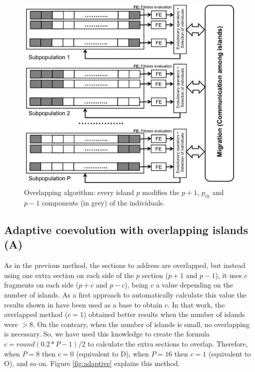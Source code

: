 \documentclass[preprint]{elsarticle}
\begin{document}
\begin{figure}
\centering
\includegraphics[width=12cm]{islandNoDisjoint.jpg}
\caption{Overlapping algorithm: every island $p$ modifies the  $p+1$,
  $p_{th}$ and $p-1$  components (in grey) of the individuals.}
  \label{fig:overlapping}
\end{figure}

\subsection{Adaptive coevolution with overlapping islands (A)} 
As in the previous method, the sections to address are overlapped, but instead using one extra section on each side of the $p$ section ($p+1$ and $p-1$), it uses $c$ fragments on each side ($p+c$ and $p-c$), being $c$ a value depending on the number of islands. As a first approach to automatically calculate this value the results shown in \citep{Garcia16hpmoon} have been used as a base to obtain $c$. In that work, the overlapped method ($c=1$) obtained better results when the number of islands were $>$8. On the contrary, when the number of islands is small, no overlapping is necessary. So, we have used this knowledge to create the formula $c=round(0.2*P-1)/2$ to calculate the extra sections to overlap. Therefore, when $P=8$ then $c=0$ (equivalent to D), when $P=16$ then $c=1$ (equivalent to O), and so on. Figure \ref{fig:adaptive} explains this method.
\end{document}
